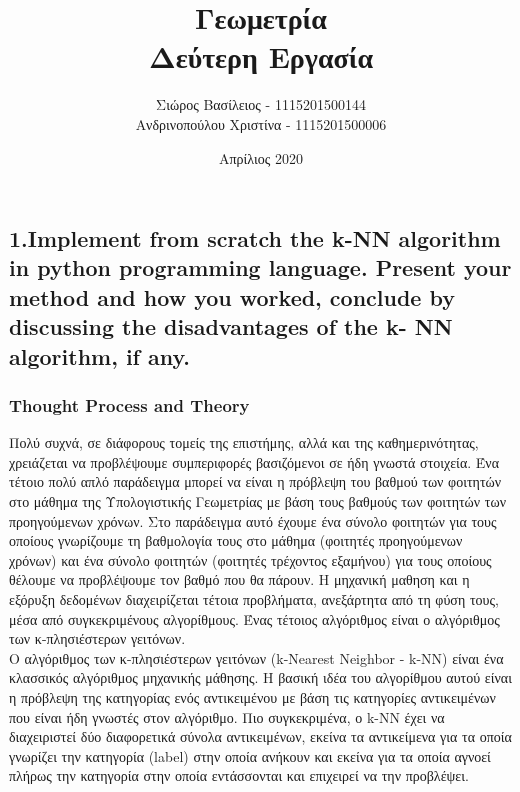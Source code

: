 \documentclass[12pt]{article}
\title{\hugeΥπολογιστική Γεωμετρία\\Δεύτερη Εργασία}
\author{Σιώρος Βασίλειος - 1115201500144\\Ανδρινοπούλου Χριστίνα - 1115201500006}
\date{Απρίλιος 2020}
\begin{document}
\maketitle


\pagebreak


\subsection*{1.Implement from scratch the k-NN algorithm in python programming language.
	Present your method and how you worked, conclude by discussing the disadvantages of the k-
	NN algorithm, if any.}

\subsubsection*{Thought Process and Theory}

Πολύ συχνά, σε διάφορους τομείς της επιστήμης, αλλά και της καθημερινότητας, χρειάζεται να προβλέψουμε συμπεριφορές βασιζόμενοι σε ήδη γνωστά στοιχεία. Ένα τέτοιο πολύ απλό παράδειγμα μπορεί να είναι η πρόβλεψη του βαθμού των φοιτητών στο μάθημα της Υπολογιστικής Γεωμετρίας με βάση τους βαθμούς των φοιτητών των προηγούμενων χρόνων. Στο παράδειγμα αυτό έχουμε ένα σύνολο φοιτητών για τους οποίους γνωρίζουμε τη βαθμολογία τους στο μάθημα (φοιτητές προηγούμενων χρόνων) και ένα σύνολο φοιτητών (φοιτητές τρέχοντος εξαμήνου) για τους οποίους θέλουμε να προβλέψουμε τον βαθμό που θα πάρουν. Η μηχανική μαθηση και η εξόρυξη δεδομένων διαχειρίζεται τέτοια προβλήματα, ανεξάρτητα από τη φύση τους, μέσα από συγκεκριμένους αλγορίθμους. Ένας τέτοιος αλγόριθμος είναι ο αλγόριθμος των κ-πλησιέστερων γειτόνων. \\

Ο αλγόριθμος των κ-πλησιέστερων γειτόνων (k-Nearest Neighbor - k-NN) είναι ένα κλασσικός αλγόριθμος μηχανικής μάθησης. Η βασική ιδέα του αλγορίθμου αυτού είναι η πρόβλεψη της κατηγορίας ενός αντικειμένου με βάση τις κατηγορίες αντικειμένων που είναι ήδη γνωστές στον αλγόριθμο. Πιο συγκεκριμένα, ο k-NN έχει να διαχειριστεί δύο διαφορετικά σύνολα αντικειμένων, εκείνα τα αντικείμενα για τα οποία γνωρίζει την κατηγορία (label) στην οποία ανήκουν και εκείνα για τα οποία αγνοεί πλήρως την κατηγορία στην οποία εντάσσονται και επιχειρεί να την προβλέψει. \\
\end{document}
